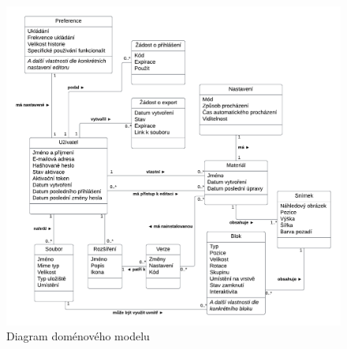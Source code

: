 \begin{figure}[ht!]
    \centering
    \includegraphics[width=1\textwidth]{media/03_analyza/domenovy_model.pdf}
    \caption{Diagram doménového modelu}\label{fig:domenovyModel}
\end{figure}